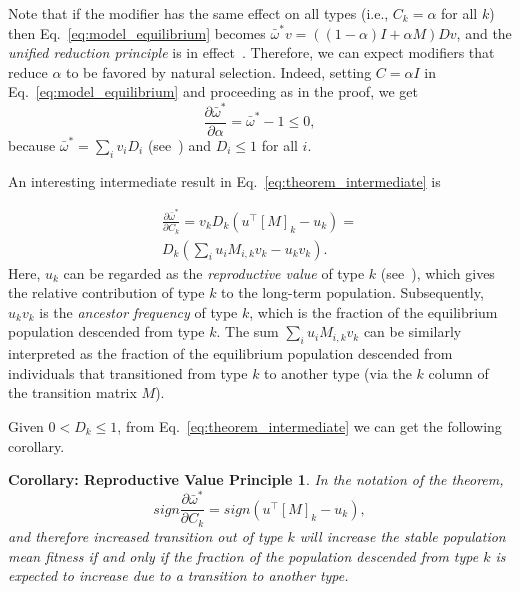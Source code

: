 \documentclass[9pt, a4paper, twocolumn]{extarticle}   	%
\newcommand*{\tr}{^\intercal}
\newtheorem*{rvp}{Corollary: Reproductive Value Principle}
\begin{document}
Note that if the modifier has the same effect on all types (i.e.,
$C_k = \alpha$ for all $k$) then Eq.~\ref{eq:model_equilibrium}
becomes $\bar{\omega}^* v = ((1-\alpha)I + \alpha M)Dv$,
and the \emph{unified reduction principle} is in effect~\cite[eqs. 65, 72]{Altenberg2017}.
Therefore, we can expect modifiers that reduce $\alpha$ to be favored by natural selection.
Indeed, setting $C = \alpha I$ in Eq.~\ref{eq:model_equilibrium} and proceeding as in the proof, we get
$$
\frac{\partial \bar{\omega}^*}{\partial \alpha} = 
\bar{\omega}^* - 1 \le 0,
$$
because $\bar{\omega}^* = \sum_i{v_i D_i}$ (see~) and $D_i \le 1$ for all $i$.


An interesting intermediate result in Eq.~\ref{eq:theorem_intermediate} is

\begin{equation}
\begin{aligned}
\frac{\partial \bar{\omega}^*}{\partial C_k} = 
v_k D_k (u\tr[M]_k - u_k) = \\
D_k (\sum_i{u_i M_{i,k} v_k} - u_k v_k).
\end{aligned}
\end{equation}
Here, $u_k$ can be regarded as the \emph{reproductive value} of type $k$ (see~), which gives the relative contribution of type $k$ to the long-term population.
Subsequently, $u_k v_k$ is the \emph{ancestor frequency} \citep{Hermisson2002} of type $k$, which is the fraction of the equilibrium population descended from type $k$.
The sum $\sum_i{u_i M_{i,k} v_k}$ can be similarly interpreted as the fraction of the equilibrium population descended from individuals that transitioned from type $k$ to another type (via the $k$ column of the transition matrix $M$).

Given $0 < D_k \le 1$, from Eq.~\ref{eq:theorem_intermediate} we can get the following corollary.

\begin{rvp}
In the notation of the theorem,
\begin{equation}
sign \frac{\partial \bar{\omega}^*}{\partial C_k} = 
sign (u\tr [M]_k - u_k),
\end{equation}
and therefore increased transition out of type $k$ will increase the stable population mean fitness if and only if the fraction of the population descended from type $k$ is expected to increase due to a transition to another type. 
\end{rvp}
\end{document}
